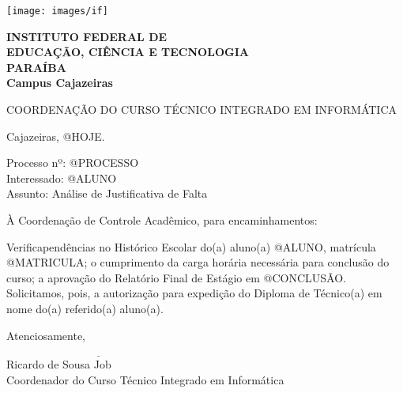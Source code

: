 \documentclass[a4paper, 12pt]{letter}
\begin{document}
\hspace{1.4cm}
\begin{minipage}{.19\textwidth}
    \texttt{[image: images/if]}
\end{minipage}
\begin{minipage}[t]{\textwidth}
        \vspace{.001cm}
        {\bf
            {\selectfont
                INSTITUTO FEDERAL DE\\
                EDUCAÇÃO, CIÊNCIA E TECNOLOGIA\\
                {\color{green}
                    PARAÍBA\\
                    Campus Cajazeiras
                }
            }
        }
\end{minipage}
{\bf
{\selectfont
    \begin{center}
        {\selectfont
            COORDENAÇÃO DO CURSO TÉCNICO INTEGRADO EM INFORMÁTICA
        }
    \end{center}
}

\begin{flushright}
Cajazeiras, @HOJE.
\end{flushright}

\noindent Processo nº: @PROCESSO\\
Interessado: @ALUNO\\
Assunto: Análise de Justificativa de Falta

\noindent À Coordenação de Controle Acadêmico, para encaminhamentos:

\onehalfspacing Verificapendências no Histórico Escolar do(a) aluno(a)\linebreak
@ALUNO, matrícula @MATRICULA; o cumprimento da carga horária necessária para conclusão do curso; a aprovação do Relatório Final de Estágio  em @CONCLUSÃO. Solicitamos, pois, a autorização para expedição do Diploma de Técnico(a) em nome do(a) referido(a) aluno(a).

Atenciosamente,

\indent $\underline{\hspace{7cm}}$\\
\indent Ricardo de Sousa Job\\
\indent Coordenador do Curso Técnico Integrado em Informática\\
}
\end{document}
